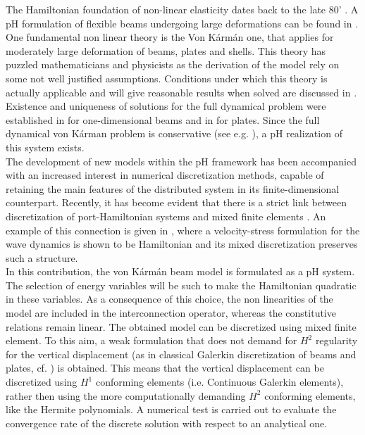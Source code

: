 \documentclass{ifacconf}
\begin{document}
The Hamiltonian foundation of non-linear elasticity dates back to the late 80' \cite{simo1988}. A pH formulation of flexible beams undergoing large deformations can be found in \cite{macchelli2007fl,macchelli2009flrig}. One fundamental non linear theory is the Von K\'arm\'an one, that applies for moderately large deformation of beams, plates and shells. This theory has puzzled mathematicians and physicists as the derivation of the model rely on some not well justified assumptions. Conditions under which this theory is actually applicable and will give reasonable results when solved are discussed in \cite{ciarlet1980,ciarlet1990}. Existence and uniqueness of solutions for the full dynamical problem were established in \cite{lagnese1991uniform} for one-dimensional beams and in \cite{puel1996} for plates. Since the full dynamical von K\'arman problem is conservative (see e.g. \cite{bilbao2015conservative}), a pH realization of this system exists. \\

The development of new models within the pH framework has been accompanied with an increased interest in numerical discretization methods, capable of retaining the main features of the distributed system in its finite-dimensional counterpart. Recently, it has become evident that there is a strict link between  discretization of port-Hamiltonian  systems and mixed finite elements \cite{cardoso2020pfem}. An example of this connection is given in \cite{kirby2015}, where a velocity-stress formulation for the wave dynamics is shown to be Hamiltonian and its mixed discretization preserves such a structure. \\

In this contribution, the von K\'arm\'an beam model is formulated as a pH system. The selection of energy variables will be such to make the Hamiltonian quadratic in these variables. As a consequence of this choice, the non linearities of the model are included in the interconnection operator, whereas the constitutive relations remain linear. The obtained model can be discretized using mixed finite element. To this aim, a weak formulation that does not demand for $H^2$ regularity for the vertical displacement (as in classical Galerkin discretization of beams and plates, cf. \cite{gustafsson2018}) is obtained. This means that the vertical displacement can be discretized using $H^1$ conforming elements (i.e. Continuous Galerkin elements), rather then using the more computationally demanding $H^2$ conforming elements, like the Hermite polynomials. A numerical test is carried out to evaluate the convergence rate of the discrete solution with respect to an analytical one. \\
\end{document}
